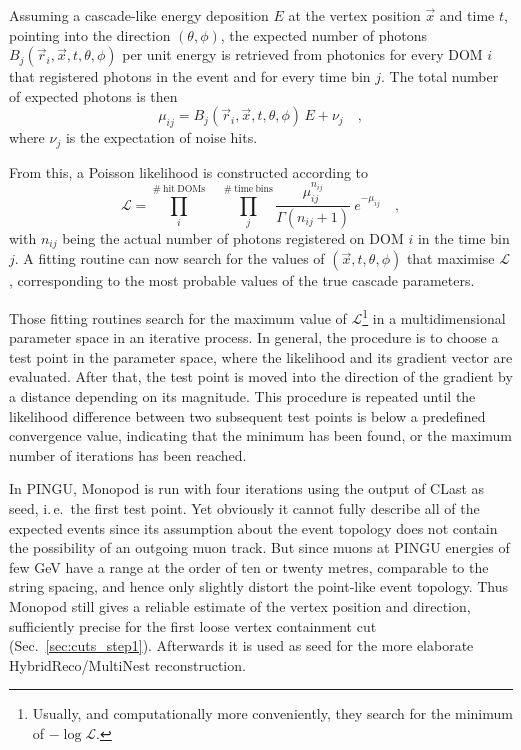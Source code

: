 Assuming a cascade-like energy deposition $E$ at the vertex position $\vec{x}$
and time $t$, pointing into the direction $(\theta, \phi)$, the expected number
of photons $B_j(\vec{r}_i, \vec{x}, t, \theta, \phi)$ per unit energy is
retrieved from photonics for every DOM $i$ that registered photons in the event
and for every time bin $j$. The total number of expected photons is then
\begin{equation}
 \mu_{ij} = B_j(\vec{r}_i, \vec{x}, t, \theta, \phi)\,E + \nu_j \quad,
\end{equation}
where $\nu_j$ is the expectation of noise hits.

From this, a Poisson likelihood is constructed according to
\begin{equation}
 \mathcal{L} = \prod_i^\mathrm{\#\ hit\ DOMs} 
   \quad \prod_{j}^\mathrm{\#\ time\ bins}
   \frac{\mu_{ij}^{n_{ij}}}{\Gamma\left(n_{ij}+1\right)}\ e^{-\mu_{ij}} \quad,
\end{equation}
with $n_{ij}$ being the actual number of photons registered on DOM $i$ in the
time bin $j$. A fitting routine can now search for the values of $(\vec{x}, t,
\theta, \phi)$ that maximise $\mathcal{L}$, corresponding to the most
probable values of the true cascade parameters.

Those fitting routines search for the maximum value of
$\mathcal{L}$\footnote{Usually, and computationally more conveniently, they
search for the minimum of $-\log\mathcal{L}$.} in a multidimensional parameter
space in an iterative process. In general, the procedure is to choose a test
point in the parameter space, where the likelihood and its gradient vector are
evaluated. After that, the test point is moved into the direction of the
gradient by a distance depending on its magnitude. This procedure is repeated
until the likelihood difference between two subsequent test points is below a
predefined convergence value, indicating that the minimum has been found, or the
maximum number of iterations has been reached.

In PINGU, Monopod is run with four iterations using the output of CLast as
seed, i.\,e.\ the first test point. Yet obviously it cannot fully describe
all of the expected events since its assumption about the event topology does
not contain the possibility of an outgoing muon track. But since muons at PINGU
energies of few GeV have a range at the order of ten or twenty metres,
comparable to the string spacing, and hence only slightly distort the point-like
event topology. Thus Monopod still gives a reliable estimate of the vertex
position and direction, sufficiently precise for the first loose vertex
containment cut (Sec.~\ref{sec:cuts_step1}). Afterwards it is used as seed for
the more elaborate HybridReco/MultiNest reconstruction.

